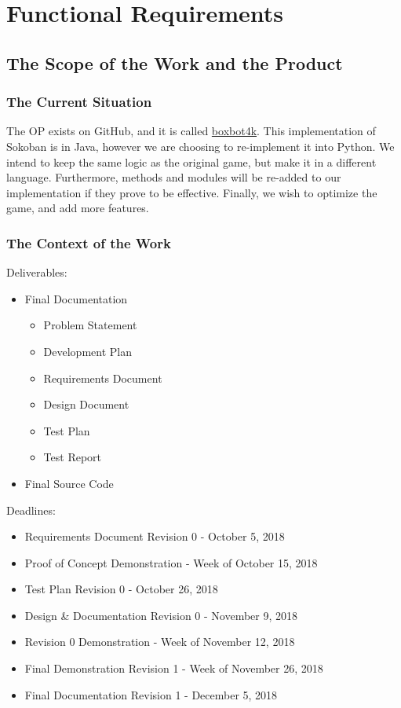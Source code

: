 \documentclass[12pt, titlepage]{article}
\begin{document}
\section{Functional Requirements}

\subsection{The Scope of the Work and the Product}

\subsubsection{The Current Situation}
The OP exists on GitHub, and it is called \href{https://github.com/gaborbata/boxbot4k}{boxbot4k}. This implementation of Sokoban is in Java, however we are choosing to re-implement it into Python. We intend to keep the same logic as the original game, but make it in a different language. Furthermore, methods and modules will be re-added to our implementation if they prove to be effective. Finally, we wish to optimize the game, and add more features.

\subsubsection{The Context of the Work}
Deliverables:
\begin{itemize}
    \item Final Documentation
    \begin{itemize}
        \item Problem Statement
        \item Development Plan
        \item Requirements Document
        \item Design Document
        \item Test Plan
        \item Test Report
    \end{itemize}
    \item Final Source Code
\end{itemize}
\noindent Deadlines:
\begin{itemize}
    \item Requirements Document Revision 0 - October 5, 2018
     \item Proof of Concept Demonstration - Week of October 15, 2018 
     \item Test Plan Revision 0 - October 26, 2018
      \item Design \& Documentation Revision 0 - November 9, 2018
      \item Revision 0 Demonstration - Week of November 12, 2018
      \item Final Demonstration Revision 1 - Week of November 26, 2018
      \item Final Documentation Revision 1 - December 5, 2018 
\end{itemize}
\end{document}
